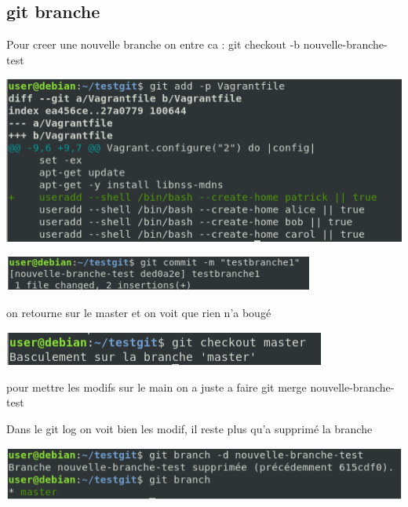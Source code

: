 \documentclass{article}
\begin{document}
 
 
 \subsection{\large{git branche}}
 
 Pour creer une nouvelle branche on entre ca : git checkout -b nouvelle-branche-test
 
 \begin{center}
        \includegraphics[scale=0.5]{Images/addp.png}
 \end{center}
 
 \begin{center}
        \includegraphics[scale=0.5]{Images/commitbranch.png}
 \end{center}
 
 on retourne sur le master et on voit que rien n'a bougé
 
 \begin{center}
        \includegraphics[scale=0.5]{Images/gitcheckout.png}
 \end{center}
 
 pour mettre les modifs sur le main on a juste a faire git merge nouvelle-branche-test \par
 
 Dans le git log on voit bien les modif, il reste plus qu'a supprimé la branche
 
 \begin{center}
        \includegraphics[scale=0.5]{Images/gitd.png}
 \end{center}
 
\end{document}
